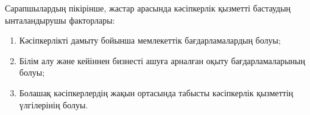 
Сарапшылардың пікірінше, жастар арасында кәсіпкерлік қызметті бастаудың
ынталандырушы факторлары:

\begin{enumerate}
\def\labelenumi{\arabic{enumi}.}
\item
  Кәсіпкерлікті дамыту бойынша мемлекеттік бағдарламалардың болуы;
\item
  Білім алу және кейіннен бизнесті ашуға арналған оқыту
  бағдарламаларының болуы;
\item
  Болашақ кәсіпкерлердің жақын ортасында табысты кәсіпкерлік қызметтің
  үлгілерінің болуы.
\end{enumerate}


